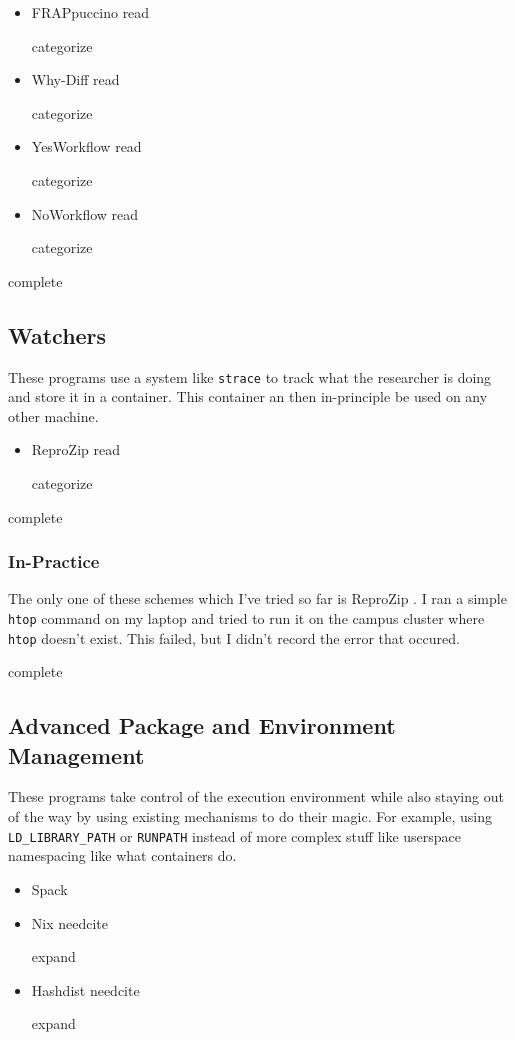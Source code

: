 \documentclass{article}
\newcommand{\Read}{
	\gls{read}
}
\newcommand{\categorize}{
	\gls{categorize}
}
\newcommand{\complete}{
	\gls{complete}
}
\newcommand{\needcite}{
	\gls{needcite}
}
\newcommand{\expand}{
	\gls{expand}
}
\begin{document}
\begin{itemize}
\item FRAPpuccino \cite{FRAPpuccino} \Read \categorize
\item Why-Diff \cite{computational-meta-data} \Read \categorize
\item YesWorkflow \cite{computational-meta-data} \Read \categorize
\item NoWorkflow \cite{computational-meta-data} \Read \categorize
\end{itemize}

\complete

\subsection{Watchers}

These programs use a system like \texttt{strace} to track what the researcher is doing and store it in a container. This container an then in-principle be used on any other machine.

\begin{itemize}
\item ReproZip \cite{reprozip} \Read \categorize
\end{itemize}

\complete

\subsubsection{In-Practice}

The only one of these schemes which I've tried so far is ReproZip \cite{reprozip}. I ran a simple \texttt{htop} command on my laptop and tried to run it on the campus cluster where \texttt{htop} doesn't exist. This failed, but I didn't record the error that occured.

\complete

\subsection{Advanced Package and Environment Management}

These programs take control of the execution environment while also staying out of the way by using existing mechanisms to do their magic. For example, using \texttt{LD\_LIBRARY\_PATH} or \texttt{RUNPATH} instead of more complex stuff like userspace namespacing like what containers do.

\begin{itemize}
\item Spack \cite{Spack}
\item Nix \needcite \expand
\item Hashdist \needcite \expand
\end{itemize}
\end{document}
